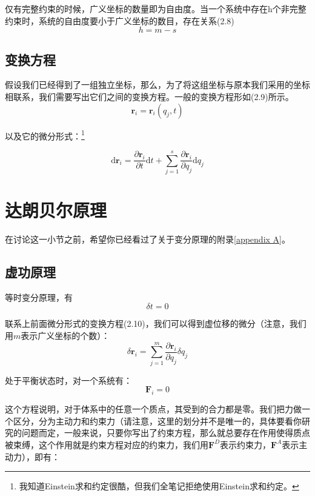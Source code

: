 \documentclass[a4paper, 10pt, openany]{book}%
\begin{document}
   仅有完整约束的时候，广义坐标的数量即为自由度。当一个系统中存在h个非完整约束时，系统的自由度要小于广义坐标的数目，存在关系(2.8)
   \begin{equation}
    h=m-s
   \end{equation}
   

   \subsection{变换方程}

   假设我们已经得到了一组独立坐标，那么，为了将这组坐标与原本我们采用的坐标相联系，我们需要写出它们之间的变换方程。一般的变换方程形如(2.9)所示。
   \begin{equation}
    \textbf{r}_i=\textbf{r}_i(q_j,t)
   \end{equation}

   以及它的微分形式：\footnote{我知道Einstein求和约定很酷，但我们全笔记拒绝使用Einstein求和约定。}

   \begin{equation}
    \mathrm{d}\textbf{r}_i=\frac{\partial \textbf{r}_i}{\partial t}\mathrm{d}t+\sum_{j=1}^s \frac{\partial \textbf{r}_i}{\partial q_j}\mathrm{d}q_j
   \end{equation}
   \section{达朗贝尔原理}
   \label{2.2}
  在讨论这一小节之前，希望你已经看过了关于变分原理的附录\ref{appendix A}。
   \subsection{虚功原理}
   
   等时变分原理，有
   \begin{equation}
    \delta t=0
   \end{equation}
   
   联系上前面微分形式的变换方程(2.10)，我们可以得到虚位移的微分（注意，我们用$m$表示广义坐标的个数）：
   \begin{equation}
    \delta \textbf{r}_i=\sum_{j=1}^m \frac{\partial \textbf{r}_i}{\partial q_j}\delta q_j
   \end{equation}

   处于平衡状态时，对一个系统有：
   \begin{equation}
   \textbf{F}_i=0
   \end{equation}

   这个方程说明，对于体系中的任意一个质点，其受到的合力都是零。我们把力做一个区分，分为主动力和约束力（请注意，这里的划分并不是唯一的，具体要看你研究的问题而定，一般来说，只要你写出了约束方程，那么就总要存在作用使得质点被束缚，这个作用就是约束方程对应的约束力，我们用$\textbf{F}^D$表示约束力，$\textbf{F}^A$表示主动力），即有：
  
\end{document}
